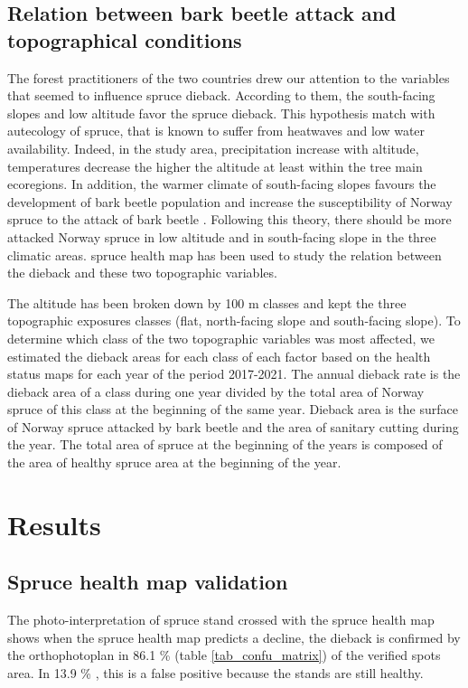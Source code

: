 \documentclass[3p,procedia]{elsarticle}
\begin{document}
\subsection{Relation between bark beetle attack and topographical conditions}

The forest practitioners of the two countries drew our attention to the variables that seemed to influence spruce dieback. 
According to them, the south-facing slopes and low altitude favor the spruce dieback.
This hypothesis match with autecology of spruce, that is known to suffer from heatwaves and low water availability. 
Indeed, in the study area, precipitation increase with altitude, temperatures decrease the higher the altitude at least within the tree main ecoregions.
In addition, the warmer climate of south-facing slopes favours the development of bark beetle population \citep{annila_influence_1969, baier_phenipscomprehensive_2007, jonsson_2009, marini_climate_2012} and increase the susceptibility of Norway spruce to the attack of bark beetle \citep{wermelinger_ecology_2004, netherer_waterlimiting_2015}.
Following this theory, there should be more attacked Norway spruce in low altitude and in south-facing slope in the three climatic areas.  
spruce health map has been used to study the relation between the dieback and these two topographic variables.

The altitude has been broken down  by 100 m classes and kept the three topographic exposures classes (flat, north-facing slope and south-facing slope).
To determine which class of the two topographic variables was most affected, we estimated the dieback areas for each class of each factor based on the health status maps for each year of the period 2017-2021.
The  annual dieback rate is  the dieback area of a class during one year divided by the total area of Norway spruce of this class at the beginning of the same year. 
Dieback area is the surface of Norway spruce attacked by bark beetle and the area of sanitary cutting during the year. 
The total area of spruce at the beginning of the years is composed of the area of healthy spruce area at the beginning of the year. 

\section{Results}


\subsection{Spruce health map validation}
The photo-interpretation of spruce stand crossed with the spruce health map shows when the spruce health map predicts a decline, the dieback is confirmed by the orthophotoplan in 86.1 \% (table \ref{tab_confu_matrix}) of the verified spots area.
In 13.9 \% , this is a false positive because the stands are still healthy.
  
\end{document}
